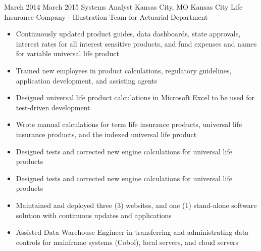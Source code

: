 
\Experience
{March 2014}
{March 2015}
{Systems Analyst}
{Kansas City, MO}
{Kansas City Life Insurance Company - Illustration Team for Actuarial Department}
{
    \begin{itemize}
        \item Continuously updated product guides, data dashboards, state
        approvals, interest rates for all interest sensitive products, and fund
        expenses and names for variable universal life product
        \item Trained new employees in product calculations, regulatory
        guidelines, application development, and assisting agents
        \item Designed universal life product calculations in Microsoft Excel to
        be used for test-driven development
        \item Wrote manual calculations for term life insurance products,
        universal life insurance products, and the indexed universal life
        product
        \item Designed tests and corrected new engine calculations for universal
        life products
        \item Designed tests and corrected new engine calculations for universal
        life products
        \item Maintained and deployed three (3) websites, and one (1)
        stand-alone software solution with continuous updates and applications
        \item Assisted Data Warehouse Engineer in transferring and
        administrating data controls for mainframe systems (Cobol), local
        servers, and cloud servers
    \end{itemize}
}
